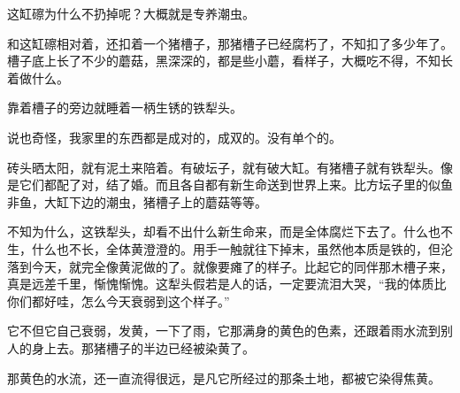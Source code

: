 \par 这缸䃰为什么不扔掉呢？大概就是专养潮虫。
\par 和这缸䃰相对着，还扣着一个猪槽子，那猪槽子已经腐朽了，不知扣了多少年了。槽子底上长了不少的蘑菇，黑深深的，都是些小蘑，看样子，大概吃不得，不知长着做什么。
\par 靠着槽子的旁边就睡着一柄生锈的铁犁头。
\par 说也奇怪，我家里的东西都是成对的，成双的。没有单个的。
\par 砖头晒太阳，就有泥土来陪着。有破坛子，就有破大缸。有猪槽子就有铁犁头。像是它们都配了对，结了婚。而且各自都有新生命送到世界上来。比方坛子里的似鱼非鱼，大缸下边的潮虫，猪槽子上的蘑菇等等。
\par 不知为什么，这铁犁头，却看不出什么新生命来，而是全体腐烂下去了。什么也不生，什么也不长，全体黄澄澄的。用手一触就往下掉末，虽然他本质是铁的，但沦落到今天，就完全像黄泥做的了。就像要瘫了的样子。比起它的同伴那木槽子来，真是远差千里，惭愧惭愧。这犁头假若是人的话，一定要流泪大哭，“我的体质比你们都好哇，怎么今天衰弱到这个样子。”
\par 它不但它自己衰弱，发黄，一下了雨，它那满身的黄色的色素，还跟着雨水流到别人的身上去。那猪槽子的半边已经被染黄了。
\par 那黄色的水流，还一直流得很远，是凡它所经过的那条土地，都被它染得焦黄。
